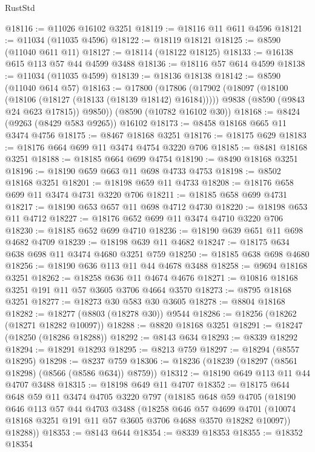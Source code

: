 \begin{lexlean}{RustStd}
\begin{coremodule}
@18116 := @11026 @16102 @3251
@18119 := @18116 @11 @611 @4596
@18121 := @11034 (@11035 @4596)
@18122 := @18119 @18121
@18125 := @8590 (@11040 @611 @11)
@18127 := @18114 (@18122 @18125)
@18133 := @16138 @615 @113 @57 @44 @4599 @3488
@18136 := @18116 @57 @614 @4599
@18138 := @11034 (@11035 @4599)
@18139 := @18136 @18138
@18142 := @8590 (@11040 @614 @57)
@18163 := @17800
    (@17806
      (@17902
        (@18097 (@18100 (@18106 (@18127 (@18133 (@18139 @18142) @16184)))))
        @9838
        (@8590 (@9843 @24 @623 @17815))
        @9850))
    (@8590 (@10782 @16102 @30))
@18168 := @8424 (@9263 (@8429 @583 @9265)) @16102
@18173 := @8458 @18168 @665 @11 @3474 @4756
@18175 := @8467 @18168 @3251
@18176 := @18175 @629
@18183 := @18176 @664 @699 @11 @3474 @4754 @3220 @706
@18185 := @8481 @18168 @3251
@18188 := @18185 @664 @699 @4754
@18190 := @8490 @18168 @3251
@18196 := @18190 @659 @663 @11 @698 @4733 @4753
@18198 := @8502 @18168 @3251
@18201 := @18198 @659 @11 @4733
@18208 := @18176 @658 @699 @11 @3474 @4731 @3220 @706
@18211 := @18185 @658 @699 @4731
@18217 := @18190 @653 @657 @11 @698 @4712 @4730
@18220 := @18198 @653 @11 @4712
@18227 := @18176 @652 @699 @11 @3474 @4710 @3220 @706
@18230 := @18185 @652 @699 @4710
@18236 := @18190 @639 @651 @11 @698 @4682 @4709
@18239 := @18198 @639 @11 @4682
@18247 := @18175 @634 @638 @698 @11 @3474 @4680 @3251 @759
@18250 := @18185 @638 @698 @4680
@18256 := @18190 @636 @113 @11 @44 @4678 @3488
@18258 := @9694 @18168 @3251
@18262 := @18258 @636 @11 @4674 @4676
@18271 := @10816 @18168 @3251 @191 @11 @57 @3605 @3706 @4664 @3570
@18273 := @8795 @18168 @3251
@18277 := @18273 @30 @583 @30 @3605
@18278 := @8804 @18168
@18282 := @18277 (@8803 (@18278 @30)) @9544
@18286 := @18256 (@18262 (@18271 @18282 @10097))
@18288 := @8820 @18168 @3251
@18291 := @18247 (@18250 (@18286 @18288))
@18292 := @8143 @634
@18293 := @8339 @18292
@18294 := @18291 @18293
@18295 := @8213 @759
@18297 := @18294 (@8557 @18295)
@18298 := @8237 @759
@18306 := @18236 (@18239 (@18297 (@8561 @18298) (@8566 (@8586 @634)) @8759))
@18312 := @18190 @649 @113 @11 @44 @4707 @3488
@18315 := @18198 @649 @11 @4707
@18352 := @18175
    @644
    @648
    @59
    @11
    @3474
    @4705
    @3220
    @797
    (@18185
      @648
      @59
      @4705
      (@18190
        @646
        @113
        @57
        @44
        @4703
        @3488
        (@18258
          @646
          @57
          @4699
          @4701
          (@10074 @18168 @3251 @191 @11 @57 @3605 @3706 @4688 @3570 @18282 @10097))
        @18288))
@18353 := @8143 @644
@18354 := @8339 @18353
@18355 := @18352 @18354

\end{coremodule}
\end{lexlean}
